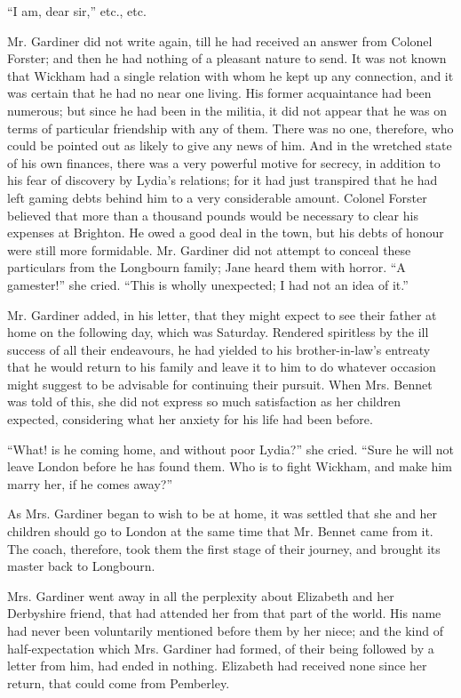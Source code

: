 ``I am, dear sir,'' etc., etc.


Mr. Gardiner did not write again, till he had received an answer from Colonel Forster; and then he had nothing of a pleasant nature to send. It was not known that Wickham had a single relation with whom he kept up any connection, and it was certain that he had no near one living. His former acquaintance had been numerous; but since he had been in the militia, it did not appear that he was on terms of particular friendship with any of them. There was no one, therefore, who could be pointed out as likely to give any news of him. And in the wretched state of his own finances, there was a very powerful motive for secrecy, in addition to his fear of discovery by Lydia's relations; for it had just transpired that he had left gaming debts behind him to a very considerable amount. Colonel Forster believed that more than a thousand pounds would be necessary to clear his expenses at Brighton. He owed a good deal in the town, but his debts of honour were still more formidable. Mr. Gardiner did not attempt to conceal these particulars from the Longbourn family; Jane heard them with horror. ``A gamester!'' she cried. ``This is wholly unexpected; I had not an idea of it.''

Mr. Gardiner added, in his letter, that they might expect to see their father at home on the following day, which was Saturday. Rendered spiritless by the ill success of all their endeavours, he had yielded to his brother-in-law's entreaty that he would return to his family and leave it to him to do whatever occasion might suggest to be advisable for continuing their pursuit. When Mrs. Bennet was told of this, she did not express so much satisfaction as her children expected, considering what her anxiety for his life had been before.

``What! is he coming home, and without poor Lydia?'' she cried. ``Sure he will not leave London before he has found them. Who is to fight Wickham, and make him marry her, if he comes away?''

As Mrs. Gardiner began to wish to be at home, it was settled that she and her children should go to London at the same time that Mr. Bennet came from it. The coach, therefore, took them the first stage of their journey, and brought its master back to Longbourn.

Mrs. Gardiner went away in all the perplexity about Elizabeth and her Derbyshire friend, that had attended her from that part of the world. His name had never been voluntarily mentioned before them by her niece; and the kind of half-expectation which Mrs. Gardiner had formed, of their being followed by a letter from him, had ended in nothing. Elizabeth had received none since her return, that could come from Pemberley.

